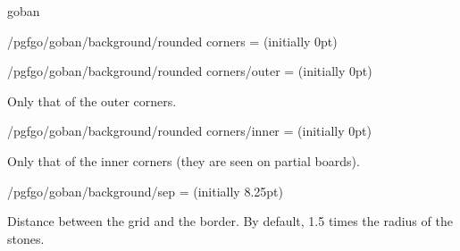 \begin{environment}{{goban}}
\begin{key}{/pgfgo/goban/background/rounded corners = (initially 0pt)}
\begin{codeexample}[]
			\begin{goban}[background = {rounded corners = 10pt}, resume = a]
			\end{goban}
		\end{codeexample}
	\end{key}


	\begin{key}{/pgfgo/goban/background/rounded corners/outer = (initially 0pt)}

		Only that of the outer corners.

		\begin{codeexample}[]

			\begin{goban}[background = {rounded corners = 0pt}, name = a]
			\end{goban}

			\begin{goban}[background = {rounded corners = {outer = 10pt}}, resume = a]
			\end{goban}
		\end{codeexample}
	\end{key}


	\begin{key}{/pgfgo/goban/background/rounded corners/inner = (initially 0pt)}

		Only that of the inner corners (they are seen on partial boards).

		\begin{codeexample}[]

			\begin{goban}[background = {rounded corners = 0pt}, name = a]
			\end{goban}

			\begin{goban}[resume = a,
				background = {rounded corners = {outer = 8pt, inner = 2pt}}]
			\end{goban}
		\end{codeexample}
	\end{key}

	\begin{key}{/pgfgo/goban/background/sep = (initially 8.25pt)}

		Distance between the grid and the border. By default, 1.5 times the radius of the stones.

		\begin{codeexample}[]


\end{codeexample}
\end{key}
\end{environment}
